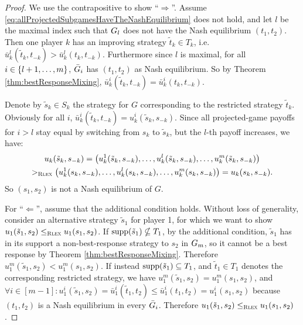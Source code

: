\documentclass[a4paper,DIV=11]{scrreprt}
\theoremstyle{definition}
\begin{document}
    \begin{proof}
        We use the contrapositive to show “$\Rightarrow$”. Assume \eqref{eq:allProjectedSubgamesHaveTheNashEquilibrium} does not hold, and let $l$ be the maximal index such that $G_{l}$ does not have the Nash equilibrium $(t_1, t_2)$.
        Then one player $k$ has an improving strategy $\tilde{t}_k \in T_k$, i.e.
        $\bar{u}_k^l(\tilde{t}_k, t_{-k}) > \bar{u}_k^l(t_k, t_{-k})$.
        Furthermore since $l$ is maximal, for all $i \in \{l+1, \dots, m\}$, $\bar{G}_{i}$ has $(t_1, t_2)$ as Nash equilibrium.
        So by Theorem \ref{thm:bestResponseMixing}, $\bar{u}_k^i(\tilde{t}_k, t_{-k}) = \bar{u}_k^i(t_k, t_{-k})$.
        
        Denote by $\tilde{s}_k \in S_k$ the strategy for $G$ corresponding to the restricted strategy $\tilde{t}_k$.
        Obviously for all $i$, $\bar{u}_k^i(\tilde{t}_k, t_{-k}) = u_k^i(\tilde{s}_k, s_{-k})$.
        Since all projected-game payoffs for $i > l$ stay equal by switching from $s_k$ to $\tilde{s}_k$, but the $l$-th payoff increases, we have:
        \begin{multline*}
                         u_k(\tilde{s}_k, s_{-k}) 
                       = \bigl(u_k^{1}(\tilde{s}_k, s_{-k}), \dots, u_k^l(\tilde{s}_k, s_{-k}), \dots, u_k^{m}(\tilde{s}_k, s_{-k})\bigr) \\
            >_{\textsc{Rlex}} \bigl(u_k^{1}(s_k, s_{-k}), \dots, u_k^l(s_k, s_{-k}), \dots, u_k^{m}(s_k, s_{-k})\bigr)
                       = u_k(s_k, s_{-k}).
        \end{multline*}
        So $(s_1, s_2)$ is not a Nash equilibrium of $G$.
        
        For “$\Leftarrow$”, assume that the additional condition holds.
        Without loss of generality, consider an alternative strategy $\tilde{s}_1$ for player 1, for which we want to show $u_1(\tilde{s}_1, s_2) \leq_{\textsc{Rlex}} u_1(s_1, s_2)$.
        If $\operatorname{supp} (\tilde{s}_1) \nsubseteq T_1$, by the additional condition, $\tilde{s}_1$ has in its support a non-best-response strategy to $s_2$ in $G_{m}$, so it cannot be a best response by Theorem \ref{thm:bestResponseMixing}. Therefore $u_1^m(\tilde{s}_1, s_2) < u_1^m(s_1, s_2)$.
        If instead $\operatorname{supp} (\tilde{s}_1) \subseteq T_1$, and $\tilde{t}_1 \in T_1$ denotes the corresponding restricted strategy,
        we have $u_1^m(\tilde{s}_1, s_2) = u_1^m(s_1, s_2)$, and  $\forall i \in [m - 1]: u_1^i(\tilde{s}_1, s_2) = \bar{u}_1^i(\tilde{t}_1, t_2) \leq \bar{u}_1^i(t_1, t_2) = u_1^i(s_1, s_2)$ because $(t_1, t_2)$ is a Nash equilibrium in every $\bar{G}_{i}$. Therefore $u_1(\tilde{s}_1, s_2) \leq_{\textsc{Rlex}} u_1(s_1, s_2)$.
    \end{proof}
\end{document}
